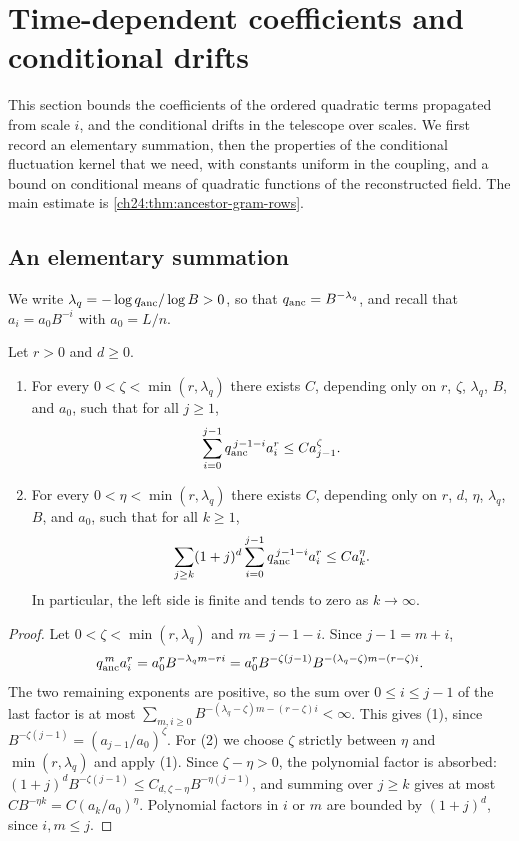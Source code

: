 \section{Time-dependent coefficients and conditional drifts}\label{ch24:sec:drifts}

This section bounds the coefficients of the ordered quadratic terms propagated from scale $i$, and the conditional drifts in the telescope over scales. We first record an elementary summation, then the properties of the conditional fluctuation kernel that we need, with constants uniform in the coupling, and a bound on conditional means of quadratic functions of the reconstructed field. The main estimate is \cref{ch24:thm:ancestor-gram-rows}.

\subsection{An elementary summation}

We write $\lambda_q=-\log q_{\mathrm{anc}}/\log B>0$, so that $q_{\mathrm{anc}}=B^{-\lambda_q}$, and recall that $a_i=a_0B^{-i}$ with $a_0=L/n$.

\begin{lemma}\label{ch24:lem:geometric-convolution}
Let $r>0$ and $d\ge0$.
\begin{enumerate}
\item For every $0<\zeta<\min(r,\lambda_q)$ there exists $C$, depending only on $r$, $\zeta$, $\lambda_q$, $B$, and $a_0$, such that for all $j\ge1$,
\[
 \sum_{i=0}^{j-1}q_{\mathrm{anc}}^{\,j-1-i}a_i^r\le Ca_{j-1}^\zeta.
\]
\item For every $0<\eta<\min(r,\lambda_q)$ there exists $C$, depending only on $r$, $d$, $\eta$, $\lambda_q$, $B$, and $a_0$, such that for all $k\ge1$,
\[
 \sum_{j\ge k}(1+j)^d\sum_{i=0}^{j-1}q_{\mathrm{anc}}^{\,j-1-i}a_i^r\le Ca_k^\eta.
\]
In particular, the left side is finite and tends to zero as $k\to\infty$.
\end{enumerate}
\end{lemma}

\begin{proof}
Let $0<\zeta<\min(r,\lambda_q)$ and $m=j-1-i$. Since $j-1=m+i$,
\[
 q_{\mathrm{anc}}^{\,m}a_i^r=a_0^rB^{-\lambda_qm-ri}=a_0^rB^{-\zeta(j-1)}B^{-(\lambda_q-\zeta)m-(r-\zeta)i}.
\]
The two remaining exponents are positive, so the sum over $0\le i\le j-1$ of the last factor is at most $\sum_{m,i\ge0}B^{-(\lambda_q-\zeta)m-(r-\zeta)i}<\infty$. This gives (1), since $B^{-\zeta(j-1)}=(a_{j-1}/a_0)^\zeta$. For (2) we choose $\zeta$ strictly between $\eta$ and $\min(r,\lambda_q)$ and apply (1). Since $\zeta-\eta>0$, the polynomial factor is absorbed: $(1+j)^dB^{-\zeta(j-1)}\le C_{d,\zeta-\eta}B^{-\eta(j-1)}$, and summing over $j\ge k$ gives at most $CB^{-\eta k}=C(a_k/a_0)^\eta$. Polynomial factors in $i$ or $m$ are bounded by $(1+j)^d$, since $i,m\le j$.
\end{proof}

